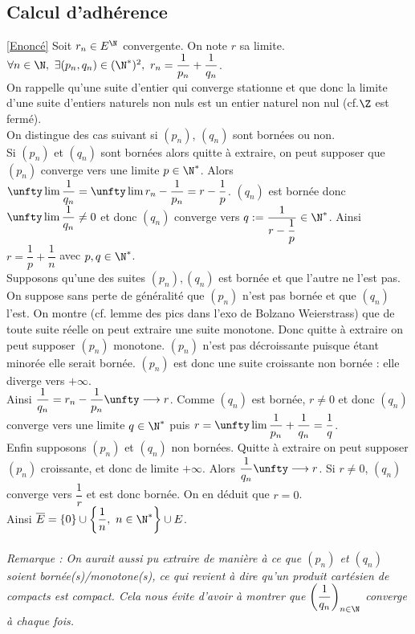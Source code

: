 \documentclass{book}
\begin{document}
	\subsection{Calcul d'adhérence }
	\label{Calcul d'adhérence corrigé}
	\textcolor{blue}{\hyperref[Calcul d'adhérence]{[Enoncé]}}
	Soit $r_n\in E^\N$ convergente. On note $r$ sa limite. $\forall n\in \N,\ \exists (p_n,q_n)\in (\N^*)^2,\ r_n=\displaystyle\frac{1}{p_n}+\frac{1}{q_n}$.\\
	On rappelle qu'une suite d'entier qui converge stationne et que donc la limite d'une suite d'entiers naturels non nuls est un entier naturel non nul (cf.$\Z$ est fermé).\\
	On distingue des cas suivant si $(p_n)$, $(q_n)$ sont bornées ou non.\\
	Si $(p_n)$ et $(q_n)$ sont bornées alors quitte à extraire, on peut supposer que $(p_n)$ converge vers une limite $p\in \N^*$. Alors $\unfty\lim\dfrac{1}{q_n}=\unfty\lim r_n-\dfrac{1}{p_n}=r-\dfrac{1}{p}$. $(q_n)$ est bornée donc $\unfty\lim\dfrac{1}{q_n}\ne 0$ et donc $(q_n)$ converge vers $q:=\dfrac{1}{r-\dfrac{1}{p}}\in \N^*$. Ainsi $r=\dfrac{1}{p}+\dfrac{1}{n}$ avec $p,q\in \N^*$.\\
	Supposons qu'une des suites $(p_n),(q_n)$ est bornée et que l'autre ne l'est pas. On suppose sans perte de généralité que $(p_n)$ n'est pas bornée et que $(q_n)$ l'est.
	On montre (cf. lemme des pics dans l'exo de Bolzano 
	Weierstrass) que de toute suite réelle on peut extraire une suite monotone. Donc quitte à extraire on peut supposer $(p_n)$ monotone. $(p_n)$ n'est pas décroissante puisque étant minorée elle serait bornée. $(p_n)$ est donc une suite croissante non bornée : elle diverge vers $+\infty$.\\
	Ainsi $\dfrac{1}{q_n}=r_n-\dfrac{1}{p_n}\unfty\longrightarrow r$. Comme $(q_n)$ est bornée, $r\ne 0$ et donc $(q_n)$ converge vers une limite $q\in \N^*$ puis $r=\unfty\lim \dfrac{1}{p_n}+\dfrac{1}{q_n}=\dfrac{1}{q}$.\\
	Enfin supposons $(p_n)$ et $(q_n)$ non bornées. Quitte à extraire on peut supposer $(p_n)$ croissante, et donc de limite $+\infty$. Alors $\dfrac{1}{q_n}\unfty\longrightarrow r$. Si $r\ne 0$, $(q_n)$ converge vers $\dfrac{1}{r}$ et est donc bornée. On en déduit que $r=0$.\\
	Ainsi $\overline E=\{0\}\cup\left\{\dfrac{1}{n},\ n\in \N^*\right\}\cup E$.\\\\
	\textit{Remarque : On aurait aussi pu extraire de manière à ce que $(p_n)$ et $(q_n)$ soient bornée(s)/monotone(s), ce qui revient à dire qu'un produit cartésien de compacts est compact. Cela nous évite d'avoir à montrer que $\left(\dfrac{1}{q_n}\right)_{n\in \N}$ converge à chaque fois.}
	
\end{document}

